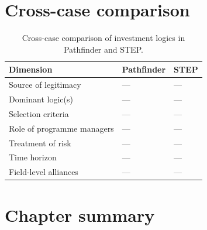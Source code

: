\section{Cross-case comparison}
\label{sec:res-comparison}

\begin{table}[H]
\centering
\caption[Cross-case comparison]{Cross-case comparison of investment logics
in Pathfinder and STEP.}
\label{tab:cross-case}
\begin{tabularx}{\textwidth}{@{} l X X @{}}
\toprule
\textbf{Dimension} & \textbf{Pathfinder} & \textbf{STEP} \\
\midrule
Source of legitimacy        & --- & --- \\
Dominant logic(s)           & --- & --- \\
Selection criteria          & --- & --- \\
Role of programme managers  & --- & --- \\
Treatment of risk           & --- & --- \\
Time horizon                & --- & --- \\
Field-level alliances       & --- & --- \\
\bottomrule
\end{tabularx}
\end{table}

\section{Chapter summary}
\label{sec:res-summary}
